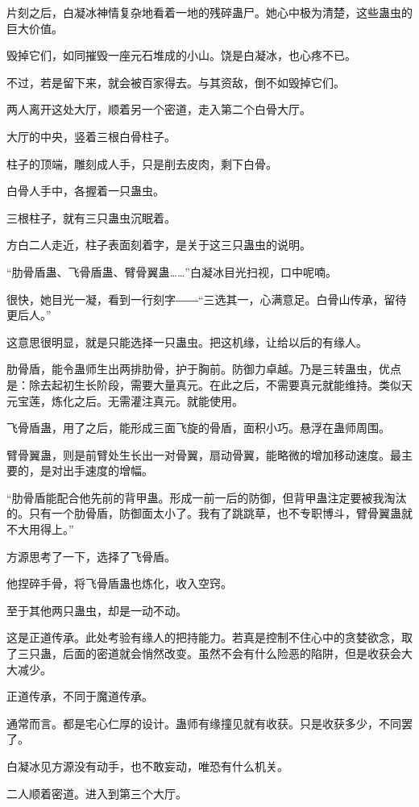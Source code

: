 \begin{this_body}
片刻之后，白凝冰神情复杂地看着一地的残碎蛊尸。她心中极为清楚，这些蛊虫的巨大价值。

毁掉它们，如同摧毁一座元石堆成的小山。饶是白凝冰，也心疼不已。

不过，若是留下来，就会被百家得去。与其资敌，倒不如毁掉它们。

两人离开这处大厅，顺着另一个密道，走入第二个白骨大厅。

大厅的中央，竖着三根白骨柱子。

柱子的顶端，雕刻成人手，只是削去皮肉，剩下白骨。

白骨人手中，各握着一只蛊虫。

三根柱子，就有三只蛊虫沉眠着。

方白二人走近，柱子表面刻着字，是关于这三只蛊虫的说明。

“肋骨盾蛊、飞骨盾蛊、臂骨翼蛊……”白凝冰目光扫视，口中呢喃。

很快，她目光一凝，看到一行刻字――“三选其一，心满意足。白骨山传承，留待更后人。”

这意思很明显，就是只能选择一只蛊虫。把这机缘，让给以后的有缘人。

肋骨盾，能令蛊师生出两排肋骨，护于胸前。防御力卓越。乃是三转蛊虫，优点是：除去起初生长阶段，需要大量真元。在此之后，不需要真元就能维持。类似天元宝莲，炼化之后。无需灌注真元。就能使用。

飞骨盾蛊，用了之后，能形成三面飞旋的骨盾，面积小巧。悬浮在蛊师周围。

臂骨翼蛊，则是前臂处生长出一对骨翼，扇动骨翼，能略微的增加移动速度。最主要的，是对出手速度的增幅。

“肋骨盾能配合他先前的背甲蛊。形成一前一后的防御，但背甲蛊注定要被我淘汰的。只有一个肋骨盾，防御面太小了。我有了跳跳草，也不专职博斗，臂骨翼蛊就不大用得上。”

方源思考了一下，选择了飞骨盾。

他捏碎手骨，将飞骨盾蛊也炼化，收入空窍。

至于其他两只蛊虫，却是一动不动。

这是正道传承。此处考验有缘人的把持能力。若真是控制不住心中的贪婪欲念，取了三只蛊，后面的密道就会悄然改变。虽然不会有什么险恶的陷阱，但是收获会大大减少。

正道传承，不同于魔道传承。

通常而言。都是宅心仁厚的设计。蛊师有缘撞见就有收获。只是收获多少，不同罢了。

白凝冰见方源没有动手，也不敢妄动，唯恐有什么机关。

二人顺着密道。进入到第三个大厅。


\end{this_body}
